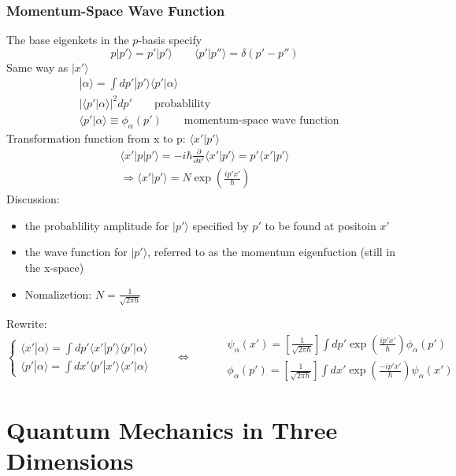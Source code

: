 \documentclass[a4paper,12pt]{article}
\begin{document}
\subsubsection{Momentum-Space Wave Function}
The base eigenkets in the \(p\)-basis specify \[
       p|p'\rangle = p'|p'\rangle\qquad \langle  p'|p''\rangle =\delta(p'-p'')\]
Same way as \({|x'\rangle}\) 
       \[\begin{aligned}
              &|\alpha\rangle=\int dp' |p'\rangle\langle p'|\alpha\rangle \\
              &|\langle p'|\alpha\rangle|^2dp' \qquad\text{probablility} \\
              &\langle p'|\alpha\rangle \equiv \phi_\alpha(p') \qquad\text{momentum-space wave function}
\end{aligned}\]
Transformation function from x to p: \(\langle x'|p'\rangle\)
\[\begin{aligned}
       \langle x'|p|p'\rangle = -i\hbar\frac{\partial}{\partial x'}\langle x'|p'\rangle=p'\langle x'|p'\rangle \\
       \Rightarrow \langle x'|p'\rangle = N\exp\left(\frac{ip'x'}{\hbar}\right) 
\end{aligned}\]
Discussion:\begin{itemize}
       \item the probablility amplitude for \(|p'\rangle\) specified by \(p'\) to be found at positoin \(x'\) 
       \item the wave function for  \(|p'\rangle\), referred to as the momentum eigenfuction (still in the x-space)
       \item Nomalizetion: \(N = \frac{1}{\sqrt{2\pi\hbar}}\)
\end{itemize}
Rewrite:\[\begin{cases}
       \langle x'|\alpha\rangle = \int dp'\langle x'|p'\rangle\langle p'|\alpha\rangle \\
       \langle p'|\alpha\rangle = \int dx'\langle p'|x'\rangle\langle x'|\alpha\rangle 
\end{cases} \qquad \Leftrightarrow \qquad 
\begin{aligned}
       & \psi_\alpha (x')= \left[\frac{1}{\sqrt{2\pi\hbar}}\right] \int dp'\exp \left(\frac{ip'x'}{\hbar}\right) \phi_\alpha(p')\\
       & \phi_\alpha (p')= \left[\frac{1}{\sqrt{2\pi\hbar}}\right] \int dx'\exp \left(\frac{-ip'x'}{\hbar}\right) \psi_\alpha(x')
\end{aligned}\]
\newpage

\section{Quantum Mechanics in Three Dimensions}
\end{document}
